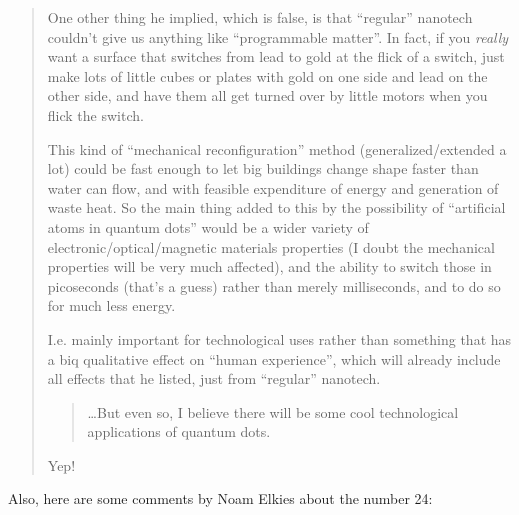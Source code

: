 \documentclass{article}
\begin{document}
\begin{quote}
One other thing he implied, which is false, is that ``regular'' nanotech
couldn't give us anything like ``programmable matter''. In fact, if you
\emph{really} want a surface that switches from lead to gold at the
flick of a switch, just make lots of little cubes or plates with gold on
one side and lead on the other side, and have them all get turned over
by little motors when you flick the switch.

This kind of ``mechanical reconfiguration'' method (generalized/extended
a lot) could be fast enough to let big buildings change shape faster
than water can flow, and with feasible expenditure of energy and
generation of waste heat. So the main thing added to this by the
possibility of ``artificial atoms in quantum dots'' would be a wider
variety of electronic/optical/magnetic materials properties (I doubt the
mechanical properties will be very much affected), and the ability to
switch those in picoseconds (that's a guess) rather than merely
milliseconds, and to do so for much less energy.

I.e. mainly important for technological uses rather than something that
has a biq qualitative effect on ``human experience'', which will already
include all effects that he listed, just from ``regular'' nanotech.

\begin{quote}
\ldots But even so, I believe there will be some cool technological
applications of quantum dots.
\end{quote}

Yep!
\end{quote}

Also, here are some comments by Noam Elkies about the number 24:
\end{document}
